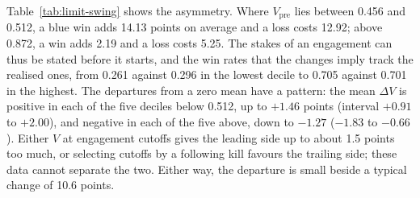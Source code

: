 Table~\ref{tab:limit-swing} shows the asymmetry. Where $V_{\mathrm{pre}}$ lies between 0.456 and 0.512, a
blue win adds 14.13 points on average and a loss costs 12.92; above 0.872, a win adds 2.19 and a loss
costs 5.25. The stakes of an engagement can thus be stated before it starts, and the win rates that the
changes imply track the realised ones, from 0.261 against 0.296 in the lowest decile to 0.705 against
0.701 in the highest. The departures from a zero mean have a pattern: the mean $\Delta V$ is positive in
each of the five deciles below 0.512, up to $+1.46$ points (interval $+0.91$ to $+2.00$), and negative in
each of the five above, down to $-1.27$ ($-1.83$ to $-0.66$). Either $V$ at engagement cutoffs gives the
leading side up to about 1.5 points too much, or selecting cutoffs by a following kill favours the
trailing side; these data cannot separate the two. Either way, the departure is small beside a typical
change of 10.6 points.

